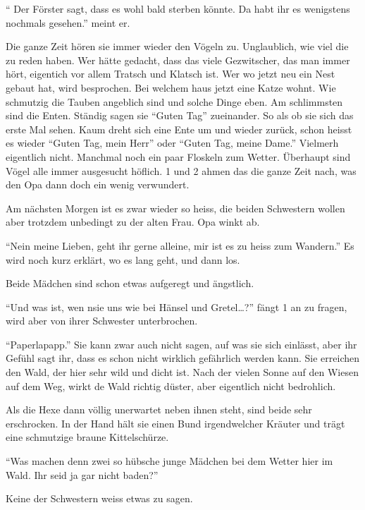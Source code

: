 \begin{mdframed}[style=mystyle]
\enquote{ Der Förster sagt, dass es wohl bald sterben könnte. Da habt ihr es wenigstens nochmals gesehen.} meint er.

Die ganze Zeit hören sie immer wieder den Vögeln zu. Unglaublich, wie viel die zu reden haben. Wer hätte gedacht, dass das viele Gezwitscher, das man immer hört, eigentich vor allem Tratsch und Klatsch ist. Wer wo jetzt neu ein Nest gebaut hat, wird besprochen. Bei welchem haus jetzt eine Katze wohnt. Wie schmutzig die Tauben angeblich sind und solche Dinge eben. Am schlimmsten sind die Enten. Ständig sagen sie \enquote{Guten Tag} zueinander. So als ob sie sich das erste Mal sehen. Kaum dreht sich eine Ente um und wieder zurück, schon heisst es wieder \enquote{Guten Tag, mein Herr} oder \enquote{Guten Tag, meine Dame.} Vielmerh eigentlich nicht. Manchmal noch ein paar Floskeln zum Wetter. Überhaupt sind Vögel alle immer ausgesucht höflich. 1 und 2 ahmen das die ganze Zeit nach, was den Opa dann doch ein wenig verwundert.

\begin{center}
\aldineleft
\end{center}

Am nächsten Morgen ist es zwar wieder so heiss, die beiden Schwestern wollen aber trotzdem unbedingt zu der alten Frau. Opa winkt ab.

\enquote{Nein meine Lieben, geht ihr gerne alleine, mir ist es zu heiss zum Wandern.} Es wird noch kurz erklärt, wo es lang geht, und dann los.

Beide Mädchen sind schon etwas aufgeregt und ängstlich.

\enquote{Und was ist, wen nsie uns wie bei Hänsel und Gretel\dots?} fängt 1 an zu fragen, wird aber von ihrer Schwester unterbrochen.

\enquote{Paperlapapp.} Sie kann zwar auch nicht sagen, auf was sie sich einlässt, aber ihr Gefühl sagt ihr, dass es schon nicht wirklich gefährlich werden kann. Sie erreichen den Wald, der hier sehr wild und dicht ist. Nach der vielen Sonne auf den Wiesen auf dem Weg, wirkt de Wald richtig düster, aber eigentlich nicht bedrohlich.

Als die Hexe dann völlig unerwartet neben ihnen steht, sind beide sehr erschrocken. In der Hand hält sie einen Bund irgendwelcher Kräuter und trägt eine schmutzige braune Kittelschürze.

\enquote{Was machen denn zwei so hübsche junge Mädchen bei dem Wetter hier im Wald. Ihr seid ja gar nicht baden?}

Keine der Schwestern weiss etwas zu sagen.


\end{mdframed}
